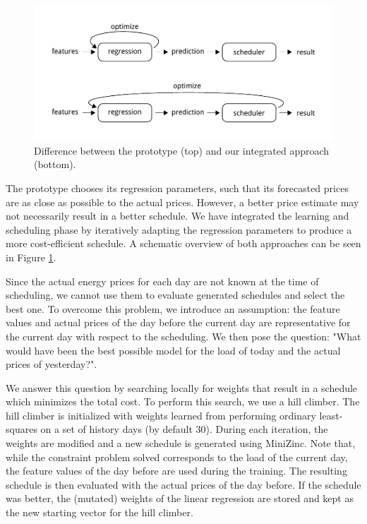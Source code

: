 \documentclass{article}
\begin{document}
\begin{figure}
	\centering
	\includegraphics[width=\textwidth]{img/feedback.pdf}
	\caption{Difference between the prototype (top) and our integrated approach (bottom).}
	\label{fig:feedback}
\end{figure}

The prototype chooses its regression parameters, such that its forecasted prices are as close as possible to the actual prices. However, a better price estimate may not necessarily result in a better schedule\cite{ifrim2012properties}. We have integrated the learning and scheduling phase by iteratively adapting the regression parameters to produce a more cost-efficient schedule. A schematic overview of both approaches can be seen in Figure \ref{fig:feedback}.

Since the actual energy prices for each day are not known at the time of scheduling, we cannot use them to evaluate generated schedules and select the best one. To overcome this problem, we introduce an assumption: the feature values and actual prices of the day before the current day are representative for the current day with respect to the scheduling. We then pose the question: "What would have been the best possible model for the load of today and the actual prices of yesterday?".

We answer this question by searching locally for weights that result in a schedule which minimizes the total cost. To perform this search, we use a hill climber. The hill climber is initialized with weights learned from performing ordinary least-squares on a set of history days (by default 30). During each iteration, the weights are modified and a new schedule is generated using MiniZinc. Note that, while the constraint problem solved corresponds to the load of the current day, the feature values of the day before are used during the training. The resulting schedule is then evaluated with the actual prices of the day before. If the schedule was better, the (mutated) weights of the linear regression are stored and kept as the new starting vector for the hill climber.
\end{document}
